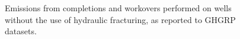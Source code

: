 \documentclass[11pt]{report}
\begin{document}
\begin{figure}[tb]
\begin{center}
\hfill
{}
\hfill
\caption{Emissions from completions and workovers performed on wells without the use of hydraulic fracturing, as reported to GHGRP datasets.}
\label{fig:CompletionWorkoverBoxNHF}
\end{center}
\end{figure}
\end{document}
